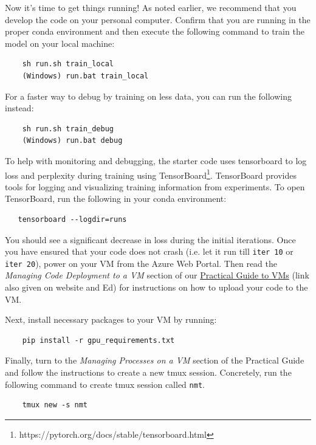 Now it's time to get things running! As noted earlier, we recommend that you develop the code on your personal computer.  Confirm that you are running in the proper conda environment and then execute the following command to train the model on your local machine:
    
\begin{lstlisting}
    sh run.sh train_local
    (Windows) run.bat train_local
\end{lstlisting}

For a faster way to debug by training on less data, you can run the following instead:
\begin{lstlisting}
    sh run.sh train_debug
    (Windows) run.bat debug
\end{lstlisting}


To help with monitoring and debugging, the starter code uses tensorboard to log loss and perplexity during training using TensorBoard\footnote{https://pytorch.org/docs/stable/tensorboard.html}. TensorBoard provides tools for logging and visualizing training information from experiments. To open TensorBoard, run the following in your conda environment:

\begin{lstlisting}
   tensorboard --logdir=runs
\end{lstlisting}

You should see a significant decrease in loss during the initial iterations. Once you have ensured that your code does not crash (i.e. let it run till \texttt{iter 10} or \texttt{iter 20}), power on your VM from the Azure Web Portal. Then read the \textit{Managing Code Deployment to a VM} section of our \href{https://docs.google.com/document/d/11kRyfClhTi4-MC1feWWCMI31fHpTzddASsDa48_Dd9E/edit?usp=sharing}{Practical Guide to VMs} (link also given on website and Ed) for instructions on how to upload your code to the VM.

Next, install necessary packages to your VM by running:
    
\begin{lstlisting}
    pip install -r gpu_requirements.txt
\end{lstlisting}

Finally, turn to the \textit{Managing Processes on a VM} section of the Practical Guide and follow the instructions to create a new tmux session. Concretely, run the following command to create tmux session called \texttt{nmt}. 
\begin{lstlisting}
    tmux new -s nmt
\end{lstlisting}


